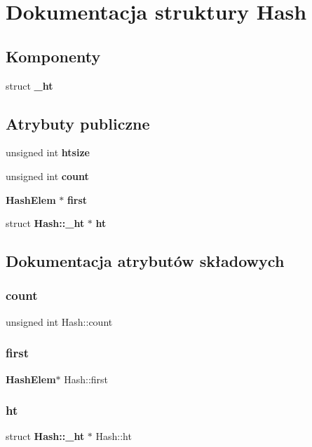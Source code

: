 \section{Dokumentacja struktury Hash}
\label{struct_hash}
\subsection*{Komponenty}
\begin{DoxyCompactItemize}
\item 
struct \textbf{ \+\_\+ht}
\end{DoxyCompactItemize}
\subsection*{Atrybuty publiczne}
\begin{DoxyCompactItemize}
\item 
unsigned int \textbf{ htsize}
\item 
unsigned int \textbf{ count}
\item 
\textbf{ Hash\+Elem} $\ast$ \textbf{ first}
\item 
struct \textbf{ Hash\+::\+\_\+ht} $\ast$ \textbf{ ht}
\end{DoxyCompactItemize}


\subsection{Dokumentacja atrybutów składowych}
\mbox{\label{struct_hash_a7ab16f173cdc347ffbe39eaa85ee6fda}} 
\subsubsection{count}
{\footnotesize\ttfamily unsigned int Hash\+::count}

\mbox{\label{struct_hash_a2cfc9936ca2a624c6492ab6557f4705b}} 
\subsubsection{first}
{\footnotesize\ttfamily \textbf{ Hash\+Elem}$\ast$ Hash\+::first}

\mbox{\label{struct_hash_ac0f36e03746a3fe69643db08d93bc0c4}} 
\subsubsection{ht}
{\footnotesize\ttfamily struct \textbf{ Hash\+::\+\_\+ht} $\ast$ Hash\+::ht}

